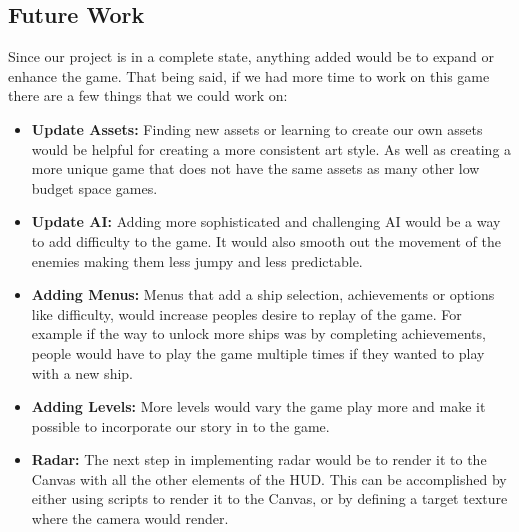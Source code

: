 \documentclass[12pt]{article}       %
\begin{document}
\subsection{Future Work}
Since our project is in a complete state, anything added would be to expand or enhance the game. That being said, if we had more time to work on this game there are a few things that we could work on:
\begin{itemize} 
	\item {\bf Update Assets:} Finding new assets or learning to create our own assets would be helpful for creating a more consistent art style. As well as creating a more unique game that does not have the same assets as many other low budget space games.  
	\item {\bf Update AI:} Adding more sophisticated and challenging AI would be a way to add difficulty to the game. It would also smooth out the movement of the enemies making them less jumpy and less predictable. 
	\item {\bf Adding Menus:} Menus that add a  ship selection, achievements or  options like difficulty, would increase peoples desire to replay of the game. For example if the way to unlock more ships was by completing achievements, people would have to play the game multiple times if they wanted to play with a new ship.
	\item {\bf Adding Levels:} More levels would vary the game play more and make it possible to incorporate our story in to the game. 
	\item {\bf Radar:} The next step in implementing radar would be to render it to the Canvas with all the other elements of the HUD. This can be accomplished by either using scripts to render it to the Canvas, or by defining a target texture where the camera would render.
\end{itemize}






\newpage
\end{document}
